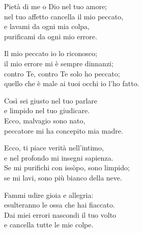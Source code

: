 

\spazio

\strofa Pietà di me o Dio nel tuo amore;\\
nel tuo affetto cancella il mio peccato,\\
e lavami da ogni mia colpa,\\
purificami da ogni mio errore.

\spazio


\spazio

\strofa Il mio peccato io lo riconosco;\\
il mio errore mi è sempre dinnanzi;\\
contro Te, contro Te solo ho peccato;\\
quello che è male ai tuoi occhi io l'ho fatto.

\spazio


\spazio

\strofa Così sei giusto nel tuo parlare\\
e limpido nel tuo giudicare.\\
Ecco, malvagio sono nato,\\
peccatore mi ha concepito mia madre.

\spazio


\spazio

\strofa Ecco, ti piace verità nell'intimo,\\
e nel profondo mi insegni sapienza.\\
Se mi purifichi con issòpo, sono limpido;\\
se mi lavi, sono più bianco della neve.

\spazio


\spazio

\strofa Fammi udire gioia e allegria:\\
esulteranno le ossa che hai fiaccato.\\
Dai miei errori nascondi il tuo volto\\
e cancella tutte le mie colpe.

\spazio


